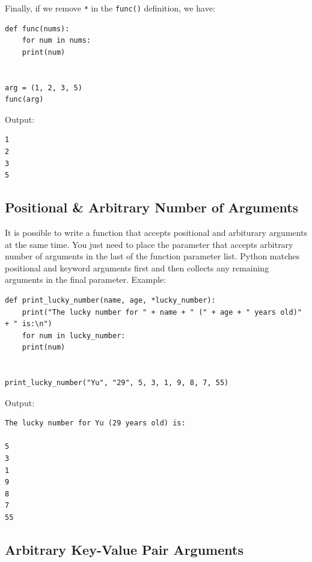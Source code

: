 \documentclass[12pt]{book}
\begin{document}
Finally, if we remove \texttt{*} in the \texttt{func()} definition, we have:
\begin{verbatim}
def func(nums):
    for num in nums:
	print(num)


arg = (1, 2, 3, 5)
func(arg)
\end{verbatim}
Output:
\begin{verbatim}
1
2
3
5
\end{verbatim}

\subsection{Positional \& Arbitrary Number of Arguments}
\label{sec:org7a7f6d4}
It is possible to write a function that accepts positional and arbiturary arguments at the same time. You just need to place the parameter that accepts arbitrary number of arguments in the last of the function parameter list. Python matches positional and keyword arguments first and then collects any remaining arguments in the final parameter. Example:
\begin{verbatim}
def print_lucky_number(name, age, *lucky_number):
    print("The lucky number for " + name + " (" + age + " years old)" + " is:\n")
    for num in lucky_number:
	print(num)


print_lucky_number("Yu", "29", 5, 3, 1, 9, 8, 7, 55)
\end{verbatim}
Output:
\begin{verbatim}
The lucky number for Yu (29 years old) is:

5
3
1
9
8
7
55
\end{verbatim}

\subsection{Arbitrary Key-Value Pair Arguments}
\label{sec:org983ec0b}
\end{document}
